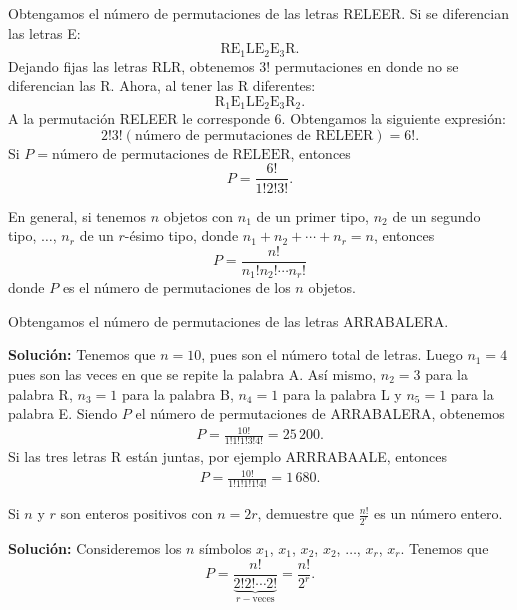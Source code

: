 \newpage

\begin{myexample}
    Obtengamos el número de permutaciones de las letras RELEER. Si se diferencian las letras E:
    $$\text{RE}_1\text{LE}_2\text{E}_3\text{R}.$$
    Dejando fijas las letras RLR, obtenemos $3!$ permutaciones en donde no se diferencian las R. Ahora, al tener las R diferentes:
    $$\text{R}_1\text{E}_1\text{LE}_2\text{E}_3\text{R}_2.$$
    A la permutación RELEER le corresponde 6. Obtengamos la siguiente expresión:
    $$2!3!(\text{número de permutaciones de RELEER}) = 6!.$$
    Si $P = \text{número de permutaciones de RELEER}$, entonces
    $$P = \frac{6!}{1!2!3!}.$$
\end{myexample}

\begin{BOX}
    En general, si tenemos $n$ objetos con $n_1$ de un primer tipo, $n_2$ de un segundo tipo, $\dots$, $n_r$ de un $r$-ésimo tipo, donde $n_1 + n_2 + \cdots + n_r = n$, entonces
    $$P = \frac{n!}{n_1!n_2! \cdots n_r!}$$
    donde $P$ es el número de permutaciones de los $n$ objetos.
\end{BOX}

\begin{myexample}
    Obtengamos el número de permutaciones de las letras ARRABALERA.

    \tcblower
    \textbf{\color{jblueleft}Solución:} Tenemos que $n = 10$, pues son el número total de letras. Luego $n_1 = 4$ pues son las veces en que se repite la palabra A. Así mismo, $n_2 = 3$ para la palabra R, $n_3 = 1$ para la palabra B, $n_4 = 1$ para la palabra L y $n_5 = 1$ para la palabra E.
    Siendo $P$ el número de permutaciones de ARRABALERA, obtenemos
    \begin{align*}
        P = \frac{10!}{1!1!1!3!4!} = 25 \, 200.
    \end{align*}
    Si las tres letras R están juntas, por ejemplo ARRRABAALE, entonces
    \begin{align*}
        P = \frac{10!}{1!1!1!1!4!} = 1 \, 680.
    \end{align*}
\end{myexample}

\begin{myexample}
    Si $n$ y $r$ son enteros positivos con $n = 2r$, demuestre que $\displaystyle \frac{n!}{2^r}$ es un número entero.

    \tcblower
    \textbf{\color{jblueleft}Solución:} Consideremos los $n$ símbolos $x_1$, $x_1$, $x_2$, $x_2$, $\dots$, $x_r$, $x_r$. Tenemos que
    $$P = \frac{n!}{\underbrace{2!2! \cdots 2!}_{r-\text{veces}}} = \frac{n!}{2^r}.$$
\end{myexample}


